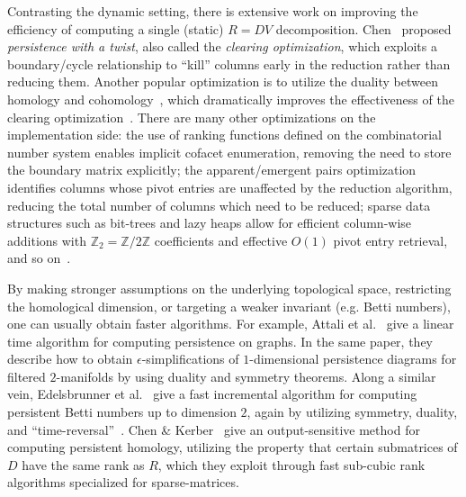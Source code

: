 \documentclass[sn-mathphys]{sn-jnl}
\begin{document}
Contrasting the dynamic setting, there is extensive work  on improving the efficiency of computing a single (static) $R = DV$ decomposition. Chen~\cite{chen2011persistent} proposed \emph{persistence with a twist}, also called the \emph{clearing optimization}, which exploits a boundary/cycle relationship to ``kill'' columns early in the reduction rather than reducing them. 
Another popular optimization is to utilize the duality between   homology and cohomology~\cite{de2011dualities}, which dramatically improves the effectiveness of the clearing optimization~\cite{bauer2021ripser}. 
There are many other optimizations on the implementation side: the use of ranking functions defined on the combinatorial number system enables implicit cofacet enumeration, removing the need to store the boundary matrix explicitly; the apparent/emergent pairs optimization identifies columns whose pivot entries are unaffected by the reduction algorithm, reducing the total number of columns which need to be reduced; sparse data structures such as bit-trees and lazy heaps allow for efficient column-wise additions with $\mathbb{Z}_2 = \mathbb{Z}/2\mathbb{Z}$ coefficients and effective $O(1)$ pivot entry retrieval, and so on~\cite{bauer2021ripser, bauer2017phat}. 

By making stronger assumptions on the underlying topological space, restricting the homological dimension, or targeting  a weaker invariant (e.g. Betti numbers), one can usually obtain faster algorithms.
For example, Attali et al.~\cite{attali2009persistence} give a linear time algorithm for computing persistence on graphs.
In the same paper, they describe how to obtain $\epsilon$-simplifications of $1$-dimensional persistence diagrams for filtered $2$-manifolds by using duality and symmetry theorems. 
Along a similar vein, Edelsbrunner et al.~\cite{edelsbrunner2000topological} give a fast incremental algorithm for computing persistent Betti numbers up to dimension $2$, again by utilizing symmetry, duality, and ``time-reversal''~\cite{delfinado1995incremental}. Chen \& Kerber~\cite{chen2013output} give an output-sensitive method for computing persistent homology,  utilizing the property that certain submatrices of  $D$ have the same rank as  $R$, which they exploit through fast sub-cubic rank algorithms specialized for sparse-matrices.  
\end{document}
